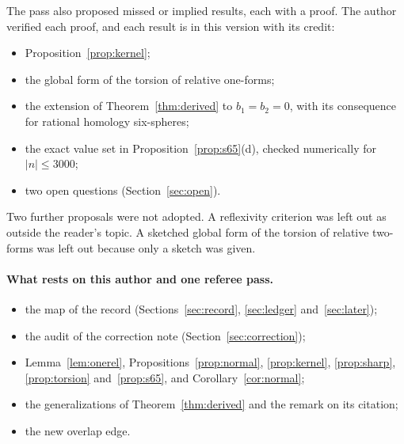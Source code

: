 The pass also proposed missed or implied results, each with a proof. The author verified each proof, and each result is in this version with its credit:
\begin{itemize}
\item Proposition~\ref{prop:kernel};
\item the global form of the torsion of relative one-forms;
\item the extension of Theorem~\ref{thm:derived} to $b_1=b_2=0$, with its consequence for rational homology six-spheres;
\item the exact value set in Proposition~\ref{prop:s65}(d), checked numerically for $|n|\le3000$;
\item two open questions (Section~\ref{sec:open}).
\end{itemize}
Two further proposals were not adopted. A reflexivity criterion was left out as outside the reader's topic. A sketched global form of the torsion of relative two-forms was left out because only a sketch was given.

\paragraph{What rests on this author and one referee pass.}
\begin{itemize}
\item the map of the record (Sections~\ref{sec:record}, \ref{sec:ledger} and~\ref{sec:later});
\item the audit of the correction note (Section~\ref{sec:correction});
\item Lemma~\ref{lem:onerel}, Propositions~\ref{prop:normal}, \ref{prop:kernel}, \ref{prop:sharp}, \ref{prop:torsion} and~\ref{prop:s65}, and Corollary~\ref{cor:normal};
\item the generalizations of Theorem~\ref{thm:derived} and the remark on its citation;
\item the new overlap edge.
\end{itemize}

